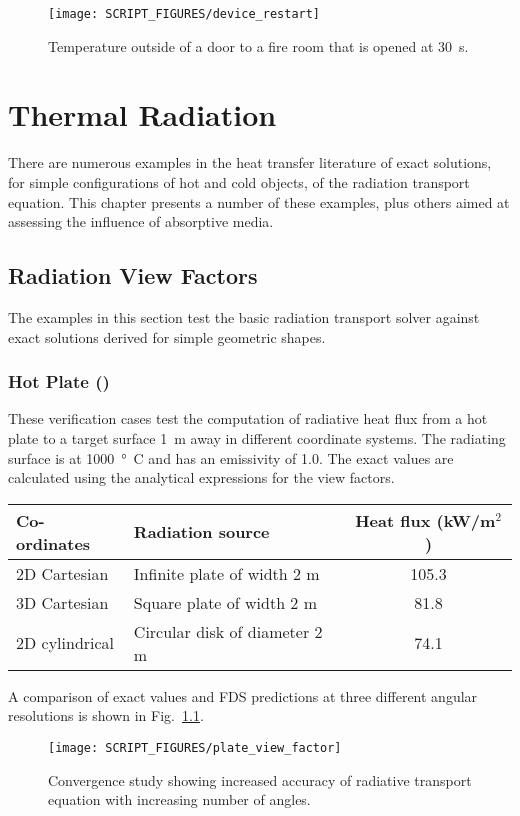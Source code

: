 \documentclass[11pt]{book}
\begin{document}
\begin{figure}[!ht]
\centering
\texttt{[image: SCRIPT\_FIGURES/device\_restart]}
\caption[Result of the  test case]{Temperature outside of a door to a fire room that is opened at 30~s.}
\label{device_restart_fig}
\end{figure}


\chapter{Thermal Radiation}

There are numerous examples in the heat transfer literature of exact solutions, for simple configurations of hot and cold objects, of the radiation transport equation. This chapter presents a number of these examples, plus others aimed at assessing the influence of absorptive media.

\section{Radiation View Factors}

The examples in this section test the basic radiation transport solver against exact solutions derived for simple geometric shapes.

\subsection{Hot Plate (\texorpdfstring{}{plate\_view\_factor}) }
\label{plate_view_factor}

These verification cases test the computation of radiative heat flux from a hot plate to a target surface 1~m away in different coordinate systems. The radiating surface is at 1000~\si{\degree C} and has an emissivity of 1.0.  The exact values are calculated using the analytical expressions for the view factors.
\begin{center}
\begin{tabular}{|l|l|c|}
\hline Co-ordinates & Radiation source & Heat flux (kW/m$^2$)  \\ \hline \hline
2D Cartesian   & Infinite plate of width 2 m   & 105.3 \\
3D Cartesian   & Square plate of width 2 m     & 81.8 \\
2D cylindrical & Circular disk of diameter 2 m & 74.1 \\ \hline
\end{tabular}
\end{center}
A comparison of exact values and FDS predictions at three different angular resolutions is shown in Fig.~\ref{fig_plate_view_factor}.
\begin{figure}[ht]
\centering
\texttt{[image: SCRIPT\_FIGURES/plate\_view\_factor]}
\caption[The  test case]{Convergence study showing increased accuracy of radiative transport equation with increasing number of angles.}
\label{fig_plate_view_factor}
\end{figure}
\end{document}
